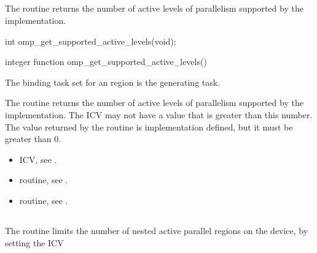 \subsection{}
\label{subsec:omp_get_supported_active_levels}

\summary
The  routine returns the
number of active levels of parallelism supported by the implementation.

\format
\begin{ccppspecific}
\begin{ompcFunction}
int omp_get_supported_active_levels(void);
\end{ompcFunction}
\end{ccppspecific}

\begin{fortranspecific}
\begin{ompfFunction}
integer function omp_get_supported_active_levels()
\end{ompfFunction}
\end{fortranspecific}

\binding
The binding task set for an 
region is the generating task.

\effect
The  routine returns the
number of active levels of parallelism supported by the implementation. The
 ICV may not have a value that is greater than
this number. The value returned by the 
routine is implementation defined, but it must be greater than 0.

\crossreferences
\begin{itemize}
\item {} ICV, see
.

\item {} routine, see
.

\item {} routine, see
.
\end{itemize}



\subsection{}
\label{subsec:omp_set_max_active_levels}
\summary
The  routine limits the number of nested active
parallel regions on the device, by setting the  ICV

